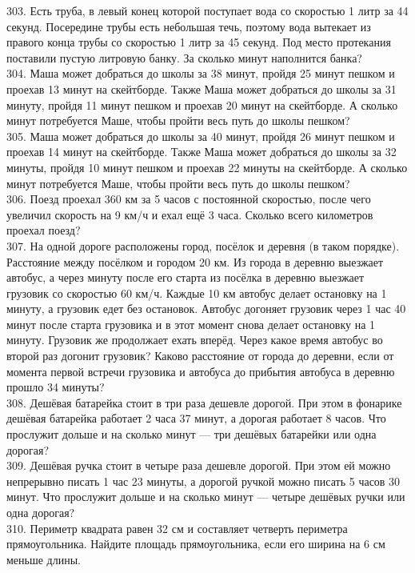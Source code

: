 303. Есть труба, в левый конец которой поступает вода со скоростью 1 литр за 44 секунд. Посередине трубы есть небольшая течь, поэтому вода вытекает из правого конца трубы со скоростью 1 литр за 45 секунд. Под место протекания поставили пустую литровую банку. За сколько минут наполнится банка?\\
304. Маша может добраться до школы за 38 минут, пройдя 25 минут пешком и проехав 13 минут на скейтборде. Также Маша может добраться до школы за 31 минуту, пройдя 11 минут пешком и проехав 20 минут на скейтборде. А сколько минут потребуется Маше, чтобы пройти весь путь до школы пешком?\\
305. Маша может добраться до школы за 40 минут, пройдя 26 минут пешком и проехав 14 минут на скейтборде. Также Маша может добраться до школы за 32 минуты, пройдя 10 минут пешком и проехав 22 минуты на скейтборде. А сколько минут потребуется Маше, чтобы пройти весь путь до школы пешком?\\
306. Поезд проехал 360 км за 5 часов с постоянной скоростью, после чего увеличил скорость на 9 км/ч и ехал ещё 3 часа. Сколько всего километров проехал поезд?\\
307. На одной дороге расположены город, посёлок и деревня (в таком порядке). Расстояние между посёлком и городом 20 км. Из города в деревню выезжает автобус, а через минуту после его старта из посёлка в деревню выезжает грузовик со скоростью 60 км/ч. Каждые 10 км автобус делает остановку на 1 минуту, а грузовик едет без остановок. Автобус догоняет грузовик через 1 час 40 минут после старта грузовика и в этот момент снова делает остановку на 1 минуту. Грузовик же продолжает ехать вперёд. Через какое время автобус во второй раз догонит грузовик? Каково расстояние от города до деревни, если от момента первой встречи грузовика и автобуса до прибытия автобуса в деревню прошло 34 минуты?\\
308. Дешёвая батарейка стоит в три раза дешевле дорогой. При этом в фонарике дешёвая батарейка работает 2 часа 37 минут, а дорогая работает 8 часов. Что прослужит дольше и на сколько минут --- три дешёвых батарейки или одна дорогая?\\
309. Дешёвая ручка стоит в четыре раза дешевле дорогой. При этом ей можно непрерывно писать 1 час 23 минуты, а дорогой ручкой можно писать 5 часов 30 минут. Что прослужит дольше и на сколько минут --- четыре дешёвых ручки или одна дорогая?\\
310. Периметр квадрата равен 32 см и составляет четверть периметра прямоугольника. Найдите площадь прямоугольника, если его ширина на 6 см меньше длины.\\
